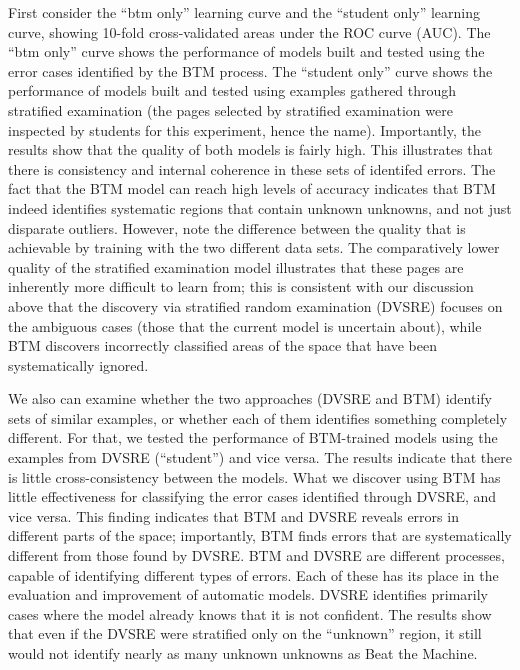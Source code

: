 First consider the ``btm only'' learning curve and the ``student only'' learning curve, showing 10-fold cross-validated areas under the ROC curve (AUC).
The ``btm only'' curve shows the performance of models built and tested
using the error cases identified by the BTM process.  The ``student
only'' curve shows the performance of models built and tested using
examples gathered through stratified examination (the pages selected
by stratified examination were inspected by students for this
experiment, hence the name).  Importantly,
the results show that the quality of both models is fairly high.  This
illustrates that there is consistency and internal coherence in these
sets of identifed errors.  The fact that the BTM model can reach high levels of
accuracy indicates that BTM indeed identifies systematic regions that
contain unknown unknowns, and not just disparate outliers.  However,
note the difference between the quality that is achievable by training
with the two different data sets.  The comparatively lower quality of
the stratified examination model illustrates that these pages are inherently
more difficult to learn from; this is consistent with our discussion
above that the discovery via stratified random examination (DVSRE)
focuses on the ambiguous cases (those that the current model is
uncertain about), while BTM discovers incorrectly classified areas of
the space that have been systematically ignored.

We also can examine whether the two approaches (DVSRE and BTM) identify sets of similar examples, or whether each of them identifies something completely different. For that, we tested the performance of BTM-trained models using the examples from DVSRE (``student'') and vice versa. The results indicate that there is little cross-consistency between the models. What we discover using BTM has little effectiveness for classifying the error cases identified through DVSRE, and vice versa. This finding indicates that BTM and DVSRE reveals errors in different parts of the space; importantly, BTM finds errors that are systematically different from those found by DVSRE.
BTM and DVSRE are different processes, capable of identifying different types of errors. Each of these has its place in the evaluation and improvement of automatic models. DVSRE identifies primarily cases where the model already knows that it is not confident. 
The results show that even if the DVSRE were stratified only on the ``unknown'' region, it still would not identify nearly as many unknown unknowns as Beat the Machine.



